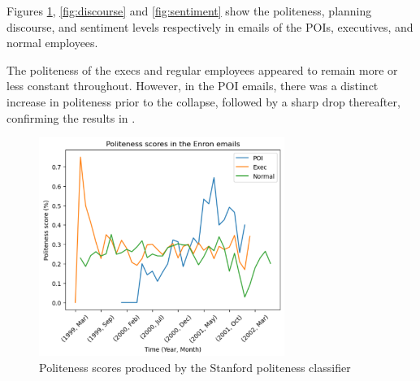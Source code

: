 

Figures \ref{fig:politeness}, \ref{fig:discourse} and \ref{fig:sentiment} show the politeness, planning discourse, and sentiment levels respectively  in emails of the POIs, executives, and normal employees. 

The politeness of the execs and regular employees appeared to remain more or less constant throughout. However, in the POI emails, there was a distinct increase in politeness prior to the collapse, followed by a sharp drop thereafter, confirming the results in \cite{diplomacy}. 

\begin{figure}[b!]
    \centering
    \includegraphics[width=8cm]{images/politeness_plot.png}
    \caption{Politeness scores produced by the Stanford politeness classifier}
    \label{fig:politeness}
\end{figure}

